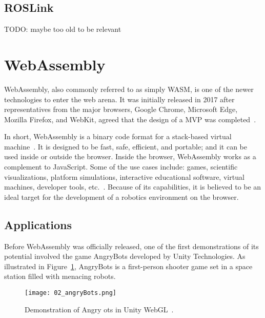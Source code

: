     \subsection{ROSLink}

    TODO: maybe too old to be relevant

    \pagebreak

\section{WebAssembly}

    WebAssembly, also commonly referred to as simply WASM, is one of the newer technologies to enter the web arena. It was initially released in 2017 after representatives from the major browsers, Google Chrome, Microsoft Edge, Mozilla Firefox, and WebKit, agreed that the design of a \ac{MVP} was completed~\cite{krill}.

    In short, WebAssembly is a binary code format for a stack-based virtual machine~\cite{wasmspec}. It is designed to be fast, safe, efficient, and portable; and it can be used inside or outside the browser. Inside the browser, WebAssembly works as a complement to JavaScript. Some of the use cases include: games, scientific visualizations, platform simulations, interactive educational software, virtual machines, developer tools, etc.~\cite{wasmdocs}. Because of its capabilities, it is believed to be an ideal target for the development of a robotics environment on the browser.

        


    \subsection{Applications}

        Before WebAssembly was officially released, one of the first demonstrations of its potential involved the game AngryBots developed by Unity Technologies. As illustrated in Figure~\ref{fig:unity}, AngryBots is a first-person shooter game set in a space station filled with menacing robots.

        \begin{figure}[htbp]
            \centering
            \texttt{[image: 02\_angryBots.png]}
            \caption{Demonstration of Angry ots in Unity WebGL~\cite{angrybots}.}\label{fig:unity}
        \end{figure}

